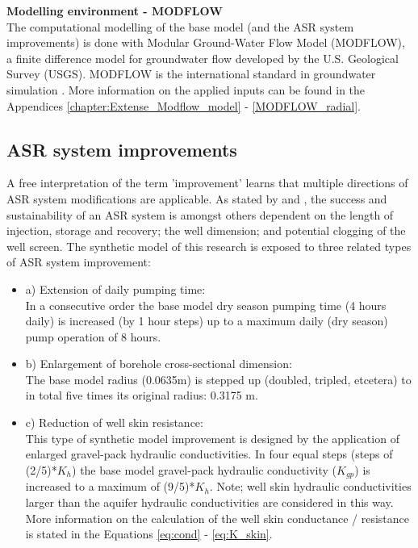 
\textbf{Modelling environment - MODFLOW} \\
The computational modelling of the base model (and the ASR system improvements) is done with Modular Ground-Water Flow Model (MODFLOW), a finite difference model for groundwater flow developed by the U.S. Geological Survey (USGS). MODFLOW is the international standard in groundwater simulation \citep{Niswonger2011,HarbaughArlen2005}. More information on the applied inputs can be found in the Appendices \ref{chapter:Extense_Modflow_model} - \ref{MODFLOW_radial}.


\subsection{ASR system improvements}
\label{subsec:improvements}
A free interpretation of the term 'improvement' learns that multiple directions of ASR system modifications are applicable. As stated by \citet{Bakker2010} and \citet{Ward2007}, the success and sustainability of an ASR system is amongst others dependent on the length of injection, storage and recovery; the well dimension; and potential clogging of the well screen. The synthetic model of this research is exposed to three related types of ASR system improvement:

\begin{itemize}
\item{a) Extension of daily pumping time:} \\
In a consecutive order the base model dry season pumping time (4 hours daily) is increased (by 1 hour steps) up to a maximum daily (dry season) pump operation of 8 hours.
\item{b) Enlargement of borehole cross-sectional dimension:} \\
The base model radius (0.0635m) is stepped up (doubled, tripled, etcetera) to in total five times its original radius: 0.3175 m. 
\item{c) Reduction of well skin resistance:} \\
This type of synthetic model improvement is designed by the application of enlarged gravel-pack hydraulic conductivities. In four equal steps (steps of (2/5)*$K_{h}$) the base model gravel-pack hydraulic conductivity ($K_{gp}$) is increased to a maximum of (9/5)*$K_{h}$. Note; well skin hydraulic conductivities larger than the aquifer hydraulic conductivities are considered in this way. More information on the calculation of the well skin conductance / resistance is stated in the Equations \ref{eq:cond} - \ref{eq:K_skin}.
\end{itemize}

